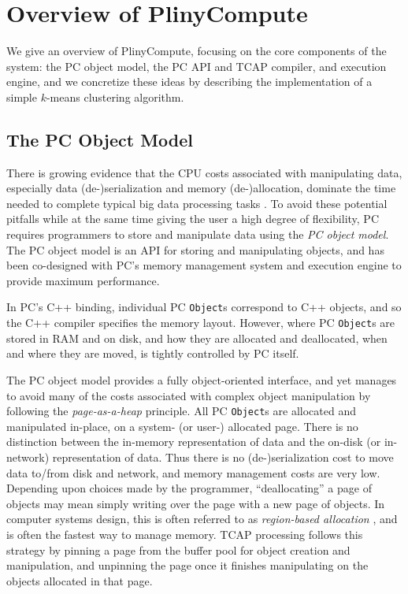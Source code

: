 
\section{Overview of PlinyCompute}

We give an overview of PlinyCompute, focusing on the core components of the
system: the PC object model, 
the PC API and TCAP compiler, and execution engine, and we concretize these ideas by
describing the implementation of a simple $k$-means clustering algorithm.

\subsection{The PC Object Model}

There is growing evidence that the CPU costs associated with manipulating data, especially data (de-)serialization and memory 
(de-)allocation,  
dominate the time needed to complete typical big data processing tasks
\cite{ousterhout2015making, shi2015clash}.
To avoid these potential pitfalls while at the same time giving the user a high degree of flexibility,
PC requires programmers to store and manipulate data using the \emph{PC object model}.
The PC object model is an API for storing and manipulating objects, and has been co-designed with PC's memory management system and execution engine to provide
maximum performance.  

In PC's C++ binding, individual PC \texttt{Object}s correspond to C++ objects, and so the C++ compiler specifies the memory layout.
However, where PC \texttt{Object}s are stored in RAM and on disk, and how they are allocated and deallocated, when and where they are moved, is
tightly controlled by PC itself.

The PC object model provides a fully object-oriented interface, and yet manages to avoid many of the costs associated with complex object manipulation
by following the \emph{page-as-a-heap} principle.  
All PC \texttt{Object}s are allocated and manipulated in-place, on a system-
(or user-) allocated page.  There is
no distinction between the in-memory representation of data and the on-disk (or in-network) representation of
data. Thus there is no (de-)serialization cost to move data to/from disk and network, and memory management costs are very low. Depending upon choices made by the
programmer, ``deallocating'' a page of objects
may mean simply writing over the page with a new page of objects.  
In computer systems design, this is often referred to as
\emph{region-based allocation} \cite{tofte1997region,
  grossman2002region}, and is often the fastest way to manage
memory. 
TCAP processing follows this strategy by pinning a page from the buffer
pool for object creation and manipulation, and unpinning the page once
it finishes manipulating on the objects allocated in that page.

